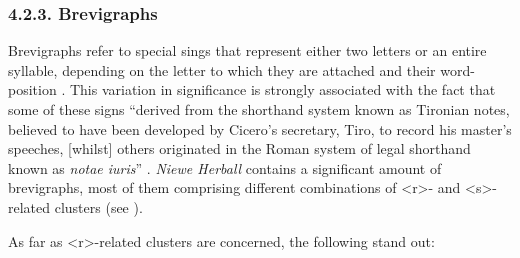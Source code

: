 \begin{paper}
\subsubsection{4.2.3. Brevigraphs}

Brevigraphs refer to special sings that represent either two
letters or an entire syllable, depending on the letter to which they are
attached and their word-position \citep[23]{petti_english_1977}. This variation in
significance is strongly associated with the fact that some of these
signs ``derived from the shorthand system known as Tironian notes,
believed to have been developed by Cicero's secretary, Tiro, to record
his master's speeches, {[}whilst{]} others originated in the Roman
system of legal shorthand known as \emph{notae iuris}'' \citep[89]{clemens_introduction_2007}. \emph{Niewe Herball} contains a significant amount of
brevigraphs, most of them comprising different combinations of
\textless r\textgreater- and \textless s\textgreater-related clusters
(see \cite[172]{de_la_cruz-cabanillas_abbreviations_2018}).

As far as \textless r\textgreater-related clusters are concerned, the
following stand out:


\end{paper}
